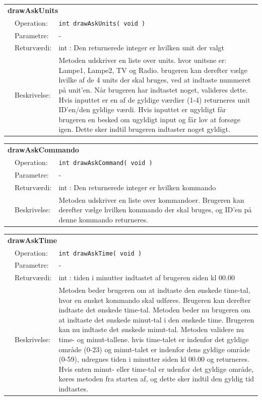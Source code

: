 \begin{table}[h]
\begin{tabularx}{\textwidth}{p{0.6 cm} l X} %
\multicolumn{3}{l}{\textbf{drawAskUnits}}\\
& Operation: & 
\texttt{int drawAskUnits( void )} 
\\ & Parametre: & 
 -
\\ & Returværdi: & 
int : Den returnerede integer er hvilken unit der valgt
\\ & Beskrivelse: & 
Metoden udskriver en liste over units. hvor unitsne er: Lampe1, Lampe2, TV og Radio.
brugeren kan derefter vælge hvilke af de 4 units der skal bruges, ved at indtaste nummeret på unit'en.
Når brugeren har indtastet noget, valideres dette. Hvis inputtet er en af de gyldige værdier (1-4) returneres unit ID'en/den gyldige værdi. Hvis inputtet er ugyldigt får brugeren en besked om ugyldigt input og får lov at forsøge igen. Dette sker indtil brugeren indtaster noget gyldigt.
\\
\end{tabularx}
\end{table}

\begin{table}[h]
\begin{tabularx}{\textwidth}{p{0.6 cm} l X} %
\multicolumn{3}{l}{\textbf{drawAskCommando}}\\
& Operation: & 
\texttt{int drawAskCommand( void )} 
\\ & Parametre: & 
 -
\\ & Returværdi: & 
int : Den returnerede integer er hvilken kommando
\\ & Beskrivelse: & 
Metoden udskriver en liste over kommandoer. Brugeren kan derefter vælge hvilken kommando der skal bruges, og ID'en på denne kommando returneres. 
\\
\end{tabularx}
\end{table}

\begin{table}[h]
\begin{tabularx}{\textwidth}{p{0.6 cm} l X} %
\multicolumn{3}{l}{\textbf{drawAskTime}}\\
& Operation: & 
\texttt{int drawAskTime( void )} 
\\ & Parametre: & 
 -
\\ & Returværdi: & 
int : tiden i minutter indtastet af brugeren siden kl 00.00
\\ & Beskrivelse: & 
Metoden beder brugeren om at indtaste den ønskede time-tal, hvor en ønsket kommando skal udføres. Brugeren kan derefter indtaste det ønskede time-tal. 
Metoden beder nu brugeren om at indtaste det ønskede minut-tal i den ønskede time. Brugeren kan nu indtaste det ønskede minut-tal. Metoden validere nu time- og minut-tallene. hvis time-talet er indenfor det gyldige område (0-23) og minut-talet er indenfor dens gyldige område (0-59), udregnes tiden i minutter siden kl 00.00 og returneres. Hvis enten minut- eller time-tal er udenfor det gyldige område, køres metoden fra starten af, og dette sker indtil den gyldig tid indtastes.
\\
\end{tabularx}
\end{table}

